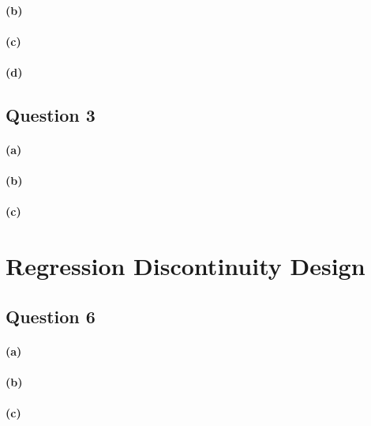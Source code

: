 \documentclass{scrartcl}
\begin{document}
\paragraph*{(b)}

\paragraph*{(c)}

\paragraph*{(d)}

\subsection*{Question 3}

\paragraph*{(a)}

\paragraph*{(b)}

\paragraph*{(c)}

\section*{Regression Discontinuity Design}

\subsection*{Question 6}

\paragraph*{(a)}

\paragraph*{(b)}

\paragraph*{(c)}
\end{document}
